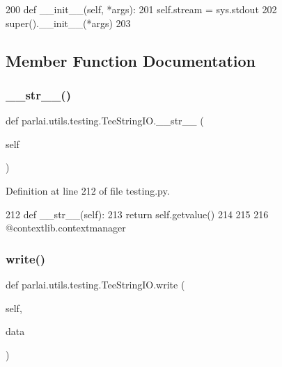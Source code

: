 \begin{DoxyCode}
200     \textcolor{keyword}{def }\_\_init\_\_(self, *args):
201         self.stream = sys.stdout
202         super().\_\_init\_\_(*args)
203 
\end{DoxyCode}


\subsection{Member Function Documentation}
\mbox{\label{classparlai_1_1utils_1_1testing_1_1TeeStringIO_a92670e92c021328191f396d1d4bb1759}} 
\subsubsection{\texorpdfstring{\+\_\+\+\_\+str\+\_\+\+\_\+()}{\_\_str\_\_()}}
{\footnotesize\ttfamily def parlai.\+utils.\+testing.\+Tee\+String\+I\+O.\+\_\+\+\_\+str\+\_\+\+\_\+ (\begin{DoxyParamCaption}\item[{}]{self }\end{DoxyParamCaption})}



Definition at line 212 of file testing.\+py.


\begin{DoxyCode}
212     \textcolor{keyword}{def }\_\_str\_\_(self):
213         \textcolor{keywordflow}{return} self.getvalue()
214 
215 
216 @contextlib.contextmanager
\end{DoxyCode}
\mbox{\label{classparlai_1_1utils_1_1testing_1_1TeeStringIO_af8c256be884cbcb0081768bc04738015}} 
\subsubsection{\texorpdfstring{write()}{write()}}
{\footnotesize\ttfamily def parlai.\+utils.\+testing.\+Tee\+String\+I\+O.\+write (\begin{DoxyParamCaption}\item[{}]{self,  }\item[{}]{data }\end{DoxyParamCaption})}

